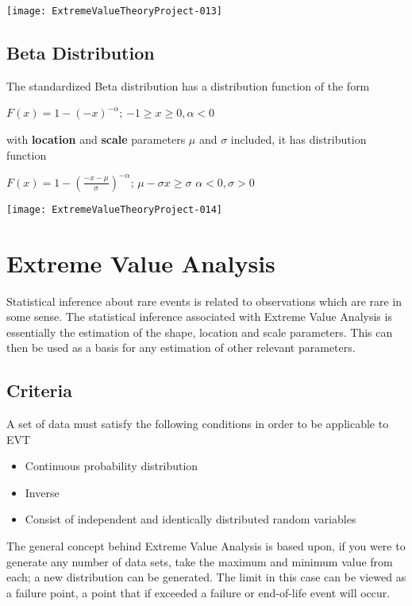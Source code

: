 \documentclass[11pt,a4paper]{article}
\theoremstyle{plain}
\begin{document}
\texttt{[image: ExtremeValueTheoryProject-013]}


\subsection*{Beta Distribution}
The standardized Beta distribution has a distribution function of the form
\begin{center}
$F(x)=1-(-x)^{-\alpha}$; $-1\geq x\geq 0,\alpha <0$
\end{center}
with \textbf{location} and \textbf{scale} parameters $\mu$ and $\sigma$ included, it has distribution function
\begin{center}
$F(x)=1-(\frac{-x-\mu}{\sigma})^{-\alpha}$; $\mu -\sigma x \geq \sigma$ $\alpha<0, \sigma>0$
\end{center}
\texttt{[image: ExtremeValueTheoryProject-014]}







\newpage
\section{Extreme Value Analysis}
Statistical inference about rare events is related to observations which are rare in some sense. The statistical inference associated with Extreme Value Analysis is essentially the estimation of the shape, location and scale parameters. This can then be used as a basis for any estimation  of other relevant parameters.

\subsection*{ \textbf{Criteria}}
A set of data must satisfy the following conditions in order to be applicable to EVT
\begin{itemize}
\item Continuous probability distribution   
\item Inverse
\item Consist of independent and identically distributed random variables 
\end{itemize}

The general concept behind Extreme Value Analysis is based upon, if you were to generate any number of data sets, take the maximum and minimum value from each; a new distribution can be generated.  
The limit in this case can be viewed as a failure point, a point that if exceeded a failure or end-of-life event will occur.  
\end{document}
